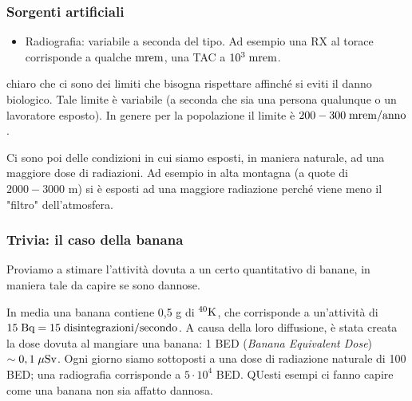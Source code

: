 \subsubsection{Sorgenti artificiali}

\begin{itemize}
    \item Radiografia: variabile a seconda del tipo. Ad esempio una RX al torace corrisponde a qualche $\rm mrem$, una TAC a $10^3 \; \rm mrem$.
\end{itemize}

\E chiaro che ci sono dei limiti che bisogna rispettare affinché si eviti il danno biologico. Tale limite è variabile (a seconda che sia una persona qualunque o un lavoratore esposto). In genere per la popolazione il limite è $200 - 300 \; \rm mrem/anno$.

Ci sono poi delle condizioni in cui siamo esposti, in maniera naturale, ad una maggiore dose di radiazioni. Ad esempio in alta montagna (a quote di $2000-3000$ m) si è esposti ad una maggiore radiazione perché viene meno il "filtro" dell'atmosfera.

\subsubsection{Trivia: il caso della banana}

Proviamo a stimare l'attività dovuta a un certo quantitativo di banane, in maniera tale da capire se sono dannose.

In media una banana contiene 0,5 g di $\rm ^{40}K$, che corrisponde a un'attività di $\rm 15 \; Bq=15 \; disintegrazioni/secondo$. A causa della loro diffusione, è stata creata la dose dovuta al mangiare una banana: 1 BED (\textit{Banana Equivalent Dose}) $\sim 0,1 \; \rm \mu Sv$. Ogni giorno siamo sottoposti a una dose di radiazione naturale di 100 BED; una radiografia corrisponde a $5 \cdot 10^4$ BED. QUesti esempi ci fanno capire come una banana non sia affatto dannosa.